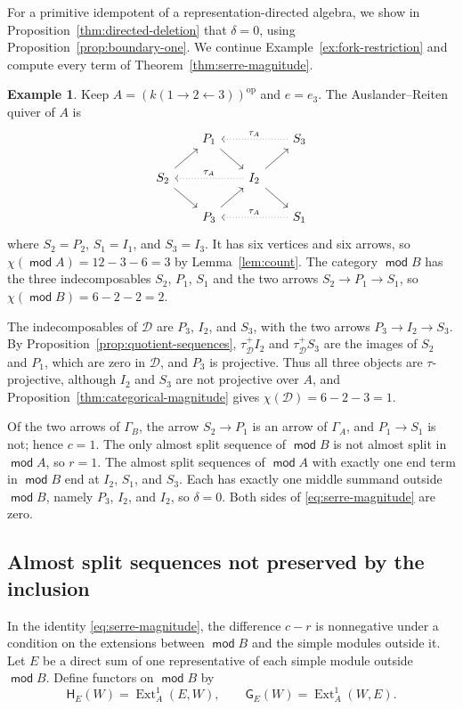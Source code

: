 \documentclass[a4paper,reqno,10pt]{amsart}
\theoremstyle{definition}
\newtheorem{example}[theorem]{Example}
\numberwithin{equation}{section}
\DeclareMathOperator{\moduleCategory}{\mathsf{mod}}
\renewcommand{\mod}{\moduleCategory}
\DeclareMathOperator{\Ext}{Ext}
\newcommand{\op}{\mathrm{op}}
\newcommand{\cD}{\mathcal D}
\begin{document}
For a primitive idempotent of a representation-directed algebra, we show
in Proposition~\ref{thm:directed-deletion} that \(\delta=0\), using
Proposition~\ref{prop:boundary-one}. We continue
Example~\ref{ex:fork-restriction} and compute every term of
Theorem~\ref{thm:serre-magnitude}.
\begin{example}\label{ex:fork-identity}
Keep \(A=(k(1\to2\leftarrow3))^{\op}\) and \(e=e_3\). The
Auslander--Reiten quiver of \(A\) is
\[
\begin{tikzcd}[column sep=1.8em,row sep=1.6em]
 &P_1\arrow[dr]&&S_3\arrow[ll,dotted,"\tau_A"']\\
 S_2\arrow[ur]\arrow[dr]&&I_2\arrow[ur]\arrow[dr]
   \arrow[ll,dotted,"\tau_A"']&\\
 &P_3\arrow[ur]&&S_1\arrow[ll,dotted,"\tau_A"']
\end{tikzcd}
\]
where \(S_2=P_2\), \(S_1=I_1\), and \(S_3=I_3\). It has six vertices and
six arrows, so \(\chi(\mod A)=12-3-6=3\) by Lemma~\ref{lem:count}. The
category \(\mod B\) has the three indecomposables \(S_2\), \(P_1\),
\(S_1\) and the two arrows \(S_2\to P_1\to S_1\), so
\(\chi(\mod B)=6-2-2=2\).

The indecomposables of \(\cD\) are \(P_3\), \(I_2\), and \(S_3\), with the
two arrows \(P_3\to I_2\to S_3\). By
Proposition~\ref{prop:quotient-sequences}, \(\tau_{\cD}^+I_2\) and
\(\tau_{\cD}^+S_3\) are the images of \(S_2\) and \(P_1\), which are zero
in \(\cD\), and \(P_3\) is projective. Thus all three objects are
\(\tau\)-projective, although \(I_2\) and \(S_3\) are not projective over
\(A\), and Proposition~\ref{thm:categorical-magnitude} gives
\(\chi(\cD)=6-2-3=1\).

Of the two arrows of \(\Gamma_B\), the arrow \(S_2\to P_1\) is an arrow of
\(\Gamma_A\), and \(P_1\to S_1\) is not; hence \(c=1\). The only almost
split sequence of \(\mod B\) is not almost split in \(\mod A\), so
\(r=1\). The almost split sequences of \(\mod A\) with exactly one
end term in \(\mod B\) end at \(I_2\), \(S_1\), and \(S_3\). Each has exactly
one middle summand outside \(\mod B\), namely \(P_3\), \(I_2\), and
\(I_2\), so \(\delta=0\). Both sides of \eqref{eq:serre-magnitude} are
zero.
\end{example}

\subsection{Almost split sequences not preserved by the inclusion}\label{subsec:extension-supports}
In the identity \eqref{eq:serre-magnitude}, the difference \(c-r\) is
nonnegative under a condition on the extensions between \(\mod B\) and
the simple modules outside it.
Let \(E\) be a direct sum of one representative of each simple module
outside \(\mod B\). Define functors on \(\mod B\) by
\[
 \mathsf H_E(W)=\Ext_A^1(E,W),\qquad \mathsf G_E(W)=\Ext_A^1(W,E).
\]
\end{document}
